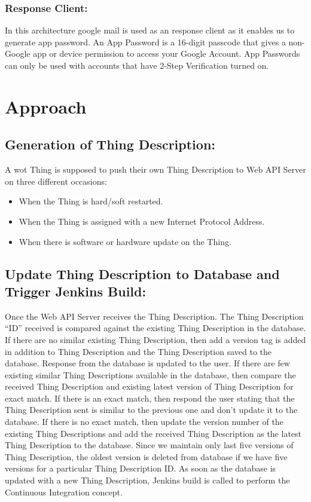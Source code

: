 \documentclass[conference]{IEEEtran}
\theoremstyle{definition}
\begin{document}
\subsubsection{Response Client:}

In this architecture google mail is used as an response client as it enables us to generate app password. 
An App Password is a 16-digit passcode that gives a non-Google app or device permission to access your Google Account. 
App Passwords can only be used with accounts that have 2-Step Verification turned on.

\section{Approach}

\subsection{Generation of Thing Description:}
  
A \ac{wot} Thing is supposed to push their own Thing Description to Web API Server on three different occasions:

\begin{itemize}
\item When the Thing is hard/soft restarted.
\item When the Thing is assigned with a new Internet Protocol Address.
\item When there is software or hardware update on the Thing.
\end{itemize}

\subsection{Update Thing Description to Database and Trigger Jenkins Build:}
  
Once the Web API Server receives the Thing Description. 
The Thing Description “ID” received is compared against the existing Thing Description in the database. 
If there are no similar existing Thing Description, then add a version tag is added in addition to Thing Description and the Thing Description saved to the database. 
Response from the database is updated to the user. 
If there are few existing similar Thing Descriptions available in the database, then compare the received Thing Description and existing latest version of Thing Description for exact match. 
If there is an exact match, then respond the user stating that the Thing Description sent is similar to the previous one and don’t update it to the database. 
If there is no exact match, then update the version number of the existing Thing Descriptions and add the received Thing Description as the latest Thing Description to the database. 
Since we maintain only last five versions of Thing Description, the oldest version is deleted from database if we have five versions for a particular Thing Description ID. 
As soon as the database is updated with a new Thing Description, Jenkins build is called to perform the Continuous Integration concept.
\end{document}
